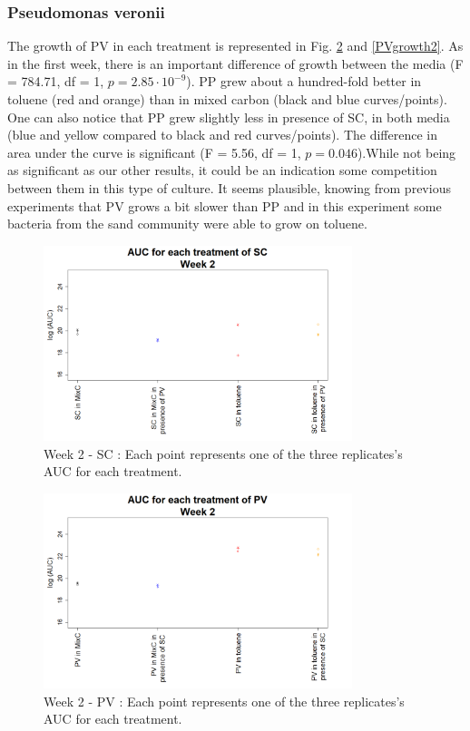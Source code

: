 \documentclass[a4paper, 10pt, conference]{ieeeconf}   %
\begin{document}
\subsubsection{Pseudomonas veronii}
The growth of PV in each treatment is represented in Fig. \ref{aucpvw2} and \ref{PVgrowth2}.
As in the first week, there is an important difference of growth between the media (F = 784.71, df = 1, $p = 2.85 \cdot 10^{-9}$). PP grew about a hundred-fold better in toluene (red and orange) than in mixed carbon (black and blue curves/points).
One can also notice that PP grew slightly less in presence of SC, in both media (blue and yellow compared to black and red curves/points). The difference in area under the curve is significant (F = 5.56, df = 1, $p = 0.046$).While not being as significant as our other results, it could be an indication some competition between them in this type of culture. It seems plausible, knowing from previous experiments that PV grows a bit slower than PP and in this experiment some bacteria from the sand community were able to grow on toluene.
\newline

\begin{figure}[H]
	\centering
	\includegraphics[width=9cm]{AUCsc2.png}
	\caption{Week 2 - SC : Each point represents one of the three replicates's AUC for each treatment.}
	\label{aucscw2}
\end{figure}%
\vspace{-0.3cm}
\begin{figure}[H]
	\centering
	\includegraphics[width=9cm]{AUCpv2.png}
	\caption{Week 2 - PV : Each point represents one of the three replicates's AUC for each treatment.}
	\label{aucpvw2}
\end{figure}
\end{document}
